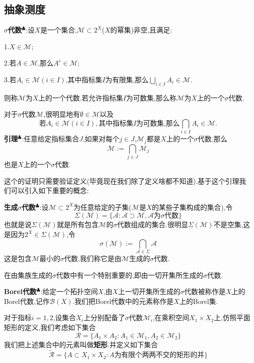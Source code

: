 \subsection{抽象测度}
\textbf{$\sigma$代数}$^\clubsuit $:设$X$是一个集合,$\mathcal{M}\subset 2^{X}$($X$的幂集)非空,且满足:\par
1.$X\in\mathcal{M}$;\par
2.若$A\in\mathcal{M}$,那么$A^c\in\mathcal{M}$;\par
3.若$A_i\in\mathcal{M}(i\in I)$,其中指标集$I$为有限集,那么$\bigcup_{i\in I}A_i\in\mathcal{M}$.\par
则称$\mathcal{M}$为$X$上的一个代数.若允许指标集$I$为可数集,那么称$\mathcal{M}$为$X$上的一个$\sigma$代数.\par
对于$\sigma$代数$\mathcal{M}$,很明显地有$\emptyset \in \mathcal{M}$以及
$$
\text{若}A_i\in\mathcal{M}(i\in I),\text{其中指标集$I$为可数集,那么}\bigcap_{i\in I}A_i\in\mathcal{M}.
$$
\qquad \textbf{引理}$^\clubsuit $:任意给定指标集合$J$,如果对每个$j\in J$,$\mathcal{M}_j$都是$X$上的一个$\sigma$代数,那么
$$
\mathcal{M}:=\bigcap_{j\in J}\mathcal{M}_j
$$
也是$X$上的一个$\sigma$代数.\par
这个的证明只需要验证定义(毕竟现在我们除了定义啥都不知道).基于这个引理我们可以引入如下重要的概念:\par
\textbf{生成$\sigma$代数}$^\clubsuit $:设$\mathcal{M}\subset 2^X$为任意给定的子集($\mathcal{M}$是$X$的某些子集构成的集合),令
$$
\Sigma (\mathcal{M})=\{\mathcal{A}:\mathcal{A}\supset\mathcal{M},\mathcal{A}\text{为$\sigma$代数}\}
$$
也就是说$\Sigma (\mathcal{M})$就是所有包含$\mathcal{M}$的$\sigma$代数组成的集合.很明显$\Sigma (\mathcal{M})$不是空集,这是因为$2^X\in \Sigma (\mathcal{M})$,令
$$
\sigma (\mathcal{M}):=\bigcap_{\mathcal{A}\in \Sigma}\mathcal{A}
$$
这是包含$\mathcal{M}$最小的$\sigma$代数,我们称它是由$\mathcal{M}$生成的$\sigma$代数.\par
在由集族生成的$\sigma$代数中有一个特别重要的,即由一切开集所生成的$\sigma$代数.\par
\textbf{Borel代数}$^\clubsuit $:给定一个拓扑空间$X$,由$X$上一切开集所生成的$\sigma$代数被称作是$X$上的Borel代数,记作$\mathcal{B}(X)$.我们把Borel代数中的元素称作是$X$上的Borel集.\par
对于指标$i=1,2$,设集合$X_i$上分别配备了$\sigma$代数$\mathcal{M}_i$,在乘积空间$X_1\times X_2$上,仿照平面矩形的定义,我们考虑如下集合
$$
\mathcal{R}=\{A_1\times A_2:A_1\in\mathcal{M}_1,A_2\in\mathcal{M}_2\}
$$
我们把上述集合中的元素叫做\textbf{矩形}.并定义如下集合
$$
\tilde{\mathcal{R}}=\{A\subset X_1\times X_2:A\text{为有限个两两不交的矩形的并}\}
$$
